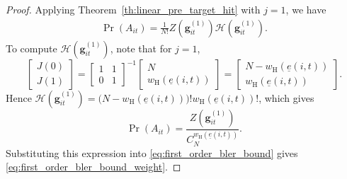 \documentclass[letterpaper,draftclsnofoot,onecolumn]{IEEEtran}
\begin{document}
\begin{proof}
Applying Theorem~\ref{th:linear_pre_target_hit} with $j=1$, we have
\begin{align}
\Pr(A_{it}) = \frac{1}{N!}Z(\mathbf{g}_{it}^{(1)})\mathcal{H}(\mathbf{g}_{it}^{(1)}).
\end{align}
To compute $\mathcal{H}(\mathbf{g}_{it}^{(1)})$, note that for $j=1$,
\begin{equation}
\left[\begin{array}{c}
J(0) \\ J(1)
\end{array}\right]
=
\left[\begin{array}{cc}
1 & 1 \\
0 & 1
\end{array}\right]^{-1}
\left[\begin{array}{c}
N \\ w_{\mathrm{H}}(\underline{e}(i,t))
\end{array}\right]
=
\left[\begin{array}{c}
N-w_{\mathrm{H}}(\underline{e}(i,t)) \\ w_{\mathrm{H}}(\underline{e}(i,t))
\end{array}\right].
\end{equation}
Hence $\mathcal{H}(\mathbf{g}_{it}^{(1)})=\bigl(N-w_{\mathrm{H}}(\underline{e}(i,t))\bigr)!w_{\mathrm{H}}(\underline{e}(i,t))!$, which gives
\begin{equation}
\Pr(A_{it}) = \frac{Z(\mathbf{g}_{it}^{(1)})}{C_{N}^{w_{\mathrm{H}}(\underline{e}(i,t))}}.
\end{equation}
Substituting this expression into \eqref{eq:first_order_bler_bound} gives \eqref{eq:first_order_bler_bound_weight}.
\end{proof}
\end{document}

